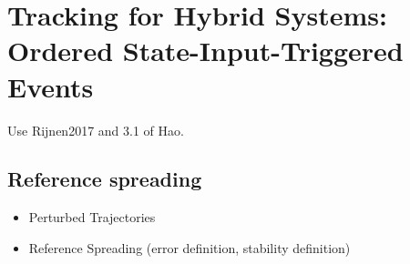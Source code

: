 \documentclass[../DC2017114Bouma.tex]{subfiles}
\begin{document}
\graphicspath{{03_Contribution/img/}}
\renewcommand{\chaptermark}[1]{\markboth{\thechapter.\ #1}{}}
\renewcommand{\sectionmark}[1]{\markright{#1}{}}

\pagestyle{fancyreport}
\cleartooddpage
\pagestyle{fancyreport}
\chapter{Tracking for Hybrid Systems: Ordered State-Input-Triggered Events}\label{ch:order}

Use Rijnen2017 and 3.1 of Hao.
\section{Reference spreading}
\begin{itemize}
\item Perturbed Trajectories
\item Reference Spreading (error definition, stability definition)
\end{itemize}
\end{document}
